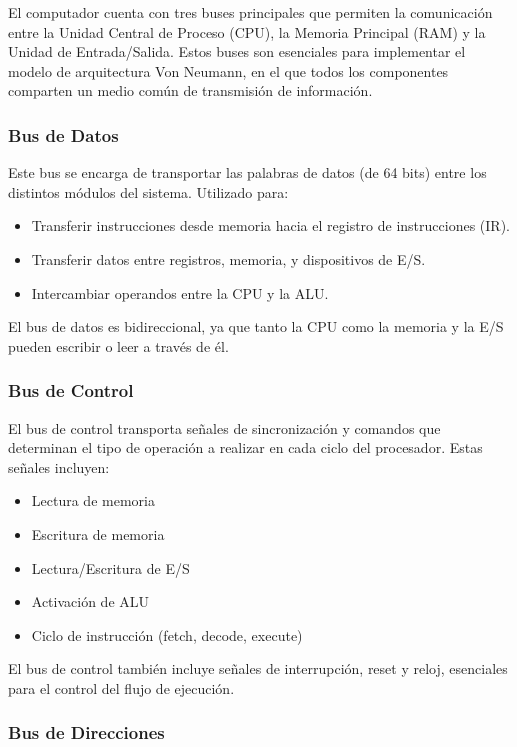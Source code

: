 \documentclass{article}
\begin{document}
El computador cuenta con tres buses principales que permiten la comunicación entre 
la Unidad Central de Proceso (CPU), la Memoria Principal (RAM) y la Unidad de 
Entrada/Salida. Estos buses son esenciales para implementar el 
modelo de arquitectura Von Neumann, en el que todos los componentes 
comparten un medio común de transmisión de información.

\subsubsection*{Bus de Datos}

Este bus se encarga de transportar las palabras de datos 
(de 64 bits) entre los distintos módulos del sistema. Utilizado para:
\begin{itemize}
  \item Transferir instrucciones desde memoria hacia el registro de instrucciones (IR).
  \item Transferir datos entre registros, memoria, y dispositivos de E/S.
  \item Intercambiar operandos entre la CPU y la ALU.
\end{itemize}
El bus de datos es bidireccional, ya que tanto la CPU como la memoria y la E/S 
pueden escribir o leer a través de él.

\subsubsection*{Bus de Control}

El bus de control transporta señales de sincronización y 
comandos que determinan el tipo de operación a realizar en cada 
ciclo del procesador. Estas señales incluyen:
\begin{itemize}
  \item Lectura de memoria
  \item Escritura de memoria
  \item Lectura/Escritura de E/S
  \item Activación de ALU
  \item Ciclo de instrucción (fetch, decode, execute)
\end{itemize}
El bus de control también incluye señales de interrupción, reset y 
reloj, esenciales para el control del flujo de ejecución.

\subsubsection*{Bus de Direcciones}
\end{document}
